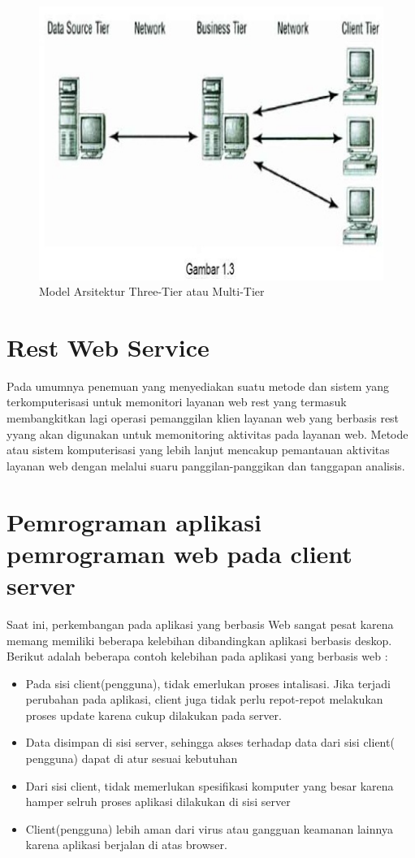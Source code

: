 {\begin{figure}[ht]
    \centerline{\includegraphics[width=1\textwidth]{figures/2model3tier}}
    \caption{Model Arsitektur Three-Tier atau Multi-Tier}
    \label{3Tier3}
\end{figure}

\section{Rest Web Service}
Pada umumnya penemuan yang menyediakan suatu metode dan sistem yang terkomputerisasi untuk memonitori layanan web rest yang termasuk membangkitkan lagi operasi pemanggilan klien layanan web yang berbasis rest yyang akan digunakan untuk memonitoring aktivitas pada layanan web. Metode atau sistem komputerisasi yang lebih lanjut mencakup pemantauan aktivitas layanan web dengan melalui suaru panggilan-panggikan dan tanggapan analisis.

\section {Pemrograman aplikasi pemrograman web pada client server}
Saat ini, perkembangan pada aplikasi yang berbasis Web sangat pesat karena memang memiliki beberapa kelebihan dibandingkan aplikasi berbasis deskop. Berikut adalah beberapa contoh kelebihan pada aplikasi yang berbasis web :
\begin{itemize}
    \item Pada sisi client(pengguna), tidak emerlukan proses intalisasi. Jika terjadi perubahan pada aplikasi, client juga tidak perlu repot-repot melakukan proses update karena cukup dilakukan  pada server.
    \item Data disimpan di sisi server, sehingga akses terhadap data dari sisi client( pengguna) dapat di atur sesuai kebutuhan
    \item Dari sisi client, tidak memerlukan spesifikasi komputer yang besar karena hamper selruh proses aplikasi dilakukan di sisi server
    \item Client(pengguna) lebih aman dari virus atau gangguan keamanan lainnya karena aplikasi berjalan di atas browser.
\end{itemize}

}

